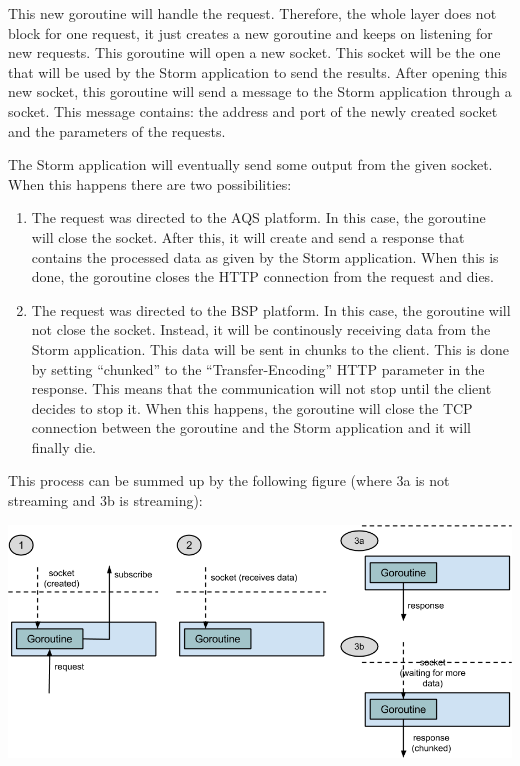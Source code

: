 This new goroutine will handle the request. Therefore, the whole layer does not
block for one request, it just creates a new goroutine and keeps on listening
for new requests. This goroutine will open a new socket. This socket will
be the one that will be used by the Storm application to send the results.
After opening this new socket, this goroutine will send a message to the Storm
application through a socket. This message contains: the address and port of the
newly created socket and the parameters of the requests.

The Storm application will eventually send some output from the given socket.
When this happens there are two possibilities:

\begin{enumerate}
  \itemsep0em
  \item The request was directed to the AQS platform. In this case, the
goroutine will close the socket. After this, it will create and send a response
that contains the processed data as given by the Storm application. When this
is done, the goroutine closes the HTTP connection from the request and dies.
  \item The request was directed to the BSP platform. In this case, the
goroutine will not close the socket. Instead, it will be continously receiving
data from the Storm application. This data will be sent in chunks to the
client. This is done by setting ``chunked'' to the ``Transfer-Encoding'' HTTP
parameter in the response. This means that the communication will not stop
until the client decides to stop it. When this happens, the goroutine will
close the TCP connection between the goroutine and the Storm application and it
will finally die.
\end{enumerate}

This process can be summed up by the following figure (where 3a is not
streaming and 3b is streaming):

\begin{center}
  \includegraphics[scale=0.7]{implementation/images/api.png}
\end{center}
